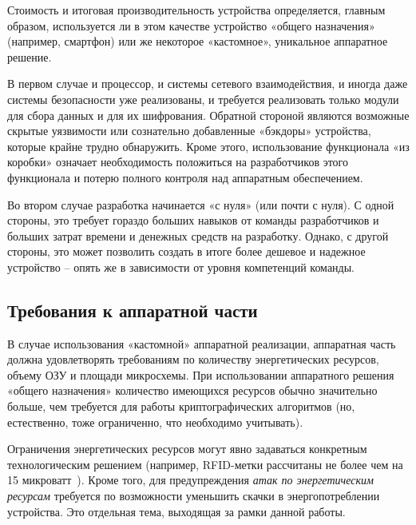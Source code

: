 Стоимость и итоговая производительность устройства определяется, главным образом, используется ли в этом качестве устройство «общего назначения» (например, смартфон) или же некоторое «кастомное», уникальное аппаратное решение.

В первом случае и процессор, и системы сетевого взаимодействия, и иногда даже системы безопасности уже реализованы, и требуется реализовать только модули для сбора данных и для их шифрования. Обратной стороной являются возможные скрытые уязвимости или сознательно добавленные «бэкдоры» устройства, которые крайне трудно обнаружить. Кроме этого, использование функционала «из коробки» означает необходимость положиться на разработчиков этого функционала и потерю полного контроля над аппаратным обеспечением.

Во втором случае разработка начинается «с нуля» (или почти с нуля). С одной стороны, это требует гораздо больших навыков от команды разработчиков и больших затрат времени и денежных средств на разработку. Однако, с другой стороны, это может позволить создать в итоге более дешевое и надежное устройство – опять же в зависимости от уровня компетенций команды.

\subsection{Требования к аппаратной части} %

В случае использования «кастомной» аппаратной реализации, аппаратная часть должна удовлетворять требованиям по количеству энергетических ресурсов, объему ОЗУ и площади микросхемы. При использовании аппаратного решения «общего назначения» количество имеющихся ресурсов обычно значительно больше, чем требуется для работы криптографических алгоритмов (но, естественно, тоже ограниченно, что необходимо учитывать).

Ограничения энергетических ресурсов могут явно задаваться конкретным технологическим решением (например, RFID-метки рассчитаны не более чем на 15 микроватт~\cite{src24}). Кроме того, для предупреждения \textit{атак по энергетическим ресурсам} требуется по возможности уменьшить скачки в энергопотреблении устройства. Это отдельная тема, выходящая за рамки данной работы.

